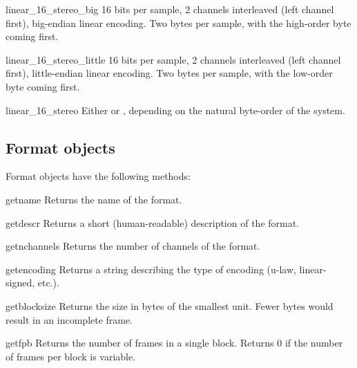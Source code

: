 \begin{datadesc}{linear_16_stereo_big}
16 bits per sample, 2 channels interleaved (left channel first),
big-endian linear encoding.  Two bytes per sample, with the high-order
byte coming first.
\end{datadesc}

\begin{datadesc}{linear_16_stereo_little}
16 bits per sample, 2 channels interleaved (left channel first),
little-endian linear encoding.  Two bytes per sample, with the
low-order byte coming first.
\end{datadesc}

\begin{datadesc}{linear_16_stereo}
Either  or ,
depending on the natural byte-order of the system.
\end{datadesc}


\subsection{Format objects
            \label{format-objects}}

Format objects have the following methods:

\begin{methoddesc}{getname}{}
Returns the name of the format.
\end{methoddesc}

\begin{methoddesc}{getdescr}{}
Returns a short (human-readable) description of the format.
\end{methoddesc}

\begin{methoddesc}{getnchannels}{}
Returns the number of channels of the format.
\end{methoddesc}

\begin{methoddesc}{getencoding}{}
Returns a string describing the type of encoding (u-law,
linear-signed, etc.).
\end{methoddesc}

\begin{methoddesc}{getblocksize}{}
Returns the size in bytes of the smallest unit.  Fewer bytes would
result in an incomplete frame.
\end{methoddesc}

\begin{methoddesc}{getfpb}{}
Returns the number of frames in a single block.  Returns 0 if the
number of frames per block is variable.
\end{methoddesc}


